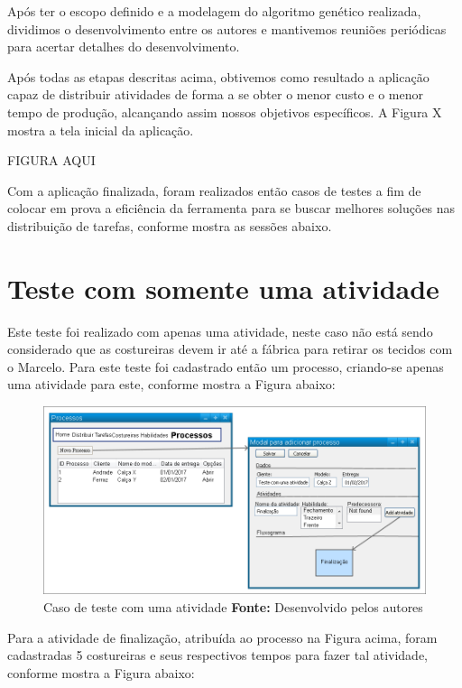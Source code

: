 \par Após ter o escopo definido e a modelagem do algoritmo genético realizada, dividimos o desenvolvimento entre os autores
e mantivemos reuniões periódicas para acertar detalhes do desenvolvimento.

\par Após todas as etapas descritas acima, obtivemos como resultado a aplicação capaz de distribuir atividades de forma a se obter o 
menor custo e o menor tempo de produção, alcançando assim nossos objetivos específicos. A Figura X mostra a tela inicial da aplicação.


FIGURA AQUI
 

\par Com a aplicação finalizada, foram realizados então casos de testes a fim de colocar em prova a eficiência da ferramenta para se 
buscar melhores soluções nas distribuição de tarefas, conforme mostra as sessões abaixo.


\section{Teste com somente uma atividade}
\par Este teste foi realizado com apenas uma atividade, neste caso não está sendo considerado que as costureiras devem ir 
até a fábrica para retirar os tecidos com o Marcelo. Para este teste foi cadastrado então um processo, criando-se apenas uma atividade para 
este, conforme mostra a Figura abaixo:

\begin{figure}[h!]
	\centerline{\includegraphics[scale=0.4]{./imagens/test_case_1.png}}
	\caption[Caso de teste]
	{Caso de teste com uma atividade \textbf{Fonte:} Desenvolvido pelos autores}
	\label{fig:exemplo1}
\end{figure}

\par Para a atividade de finalização, atribuída ao processo na Figura acima, foram cadastradas 5 costureiras e seus respectivos
tempos para fazer tal atividade, conforme mostra a Figura abaixo:

